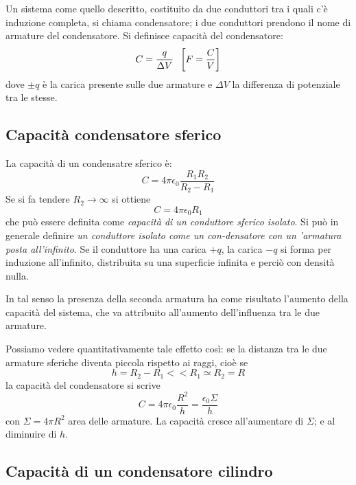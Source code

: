 \documentclass[class=book, crop=false, oneside, 12pt]{standalone}
\begin{document}
Un sistema come quello descritto, costituito da due conduttori tra i quali c'è induzione completa, si chiama condensatore; i due conduttori prendono il nome di armature del condensatore. 
Si definisce capacità del condensatore:
\begin{equation}
    C = \frac{q}{\Delta V} \hspace{0.2cm} \left[F = \frac{C}{V}\right]
\end{equation}
dove \(\pm q\) è la carica presente sulle due armature e \(\Delta V\) la differenza di potenziale tra le stesse.

\subsection{Capacità condensatore sferico}

La capacità di un condensatre sferico è:
\begin{equation}
    C = 4 \pi \epsilon_0 \frac{R_1 R_2}{R_2 - R_1}
\end{equation}
Se si fa tendere \(R_2 \rightarrow \infty\) si ottiene
\begin{equation}
    C = 4 \pi \epsilon_0 R_1
\end{equation}
che può essere definita come \emph{capacità di un conduttore sferico isolato}.
Si può in generale definire \emph{un conduttore isolato come un con-densatore con un 'armatura posta all'infinito}.
Se il conduttore ha una carica \(+q\), la carica \(- q\) si forma per induzione all'infinito, distribuita su una superficie infinita e perciò con densità nulla.

In tal senso la presenza della seconda armatura ha come risultato l'aumento della capacità del sistema, che va attribuito all'aumento dell'influenza tra le due armature.

Possiamo vedere quantitativamente tale effetto così: se la distanza tra le due armature sferiche diventa piccola rispetto ai raggi, cioè se 
\begin{equation*}
    h = R_2 - R_1 << R_1 \simeq R_2 = R
\end{equation*}
la capacità del condensatore si scrive
\begin{equation} \label{capacita_condensatore}
    C = 4 \pi \epsilon_0 \frac{R^2}{h} = \frac{\epsilon_0 \Sigma}{h}
\end{equation}
con \(\Sigma = 4 \pi R^2\) area delle armature. 
La capacità cresce all'aumentare di \(\Sigma\); e al diminuire di \(h\).

\subsection{Capacità di un condensatore cilindro}
\end{document}
